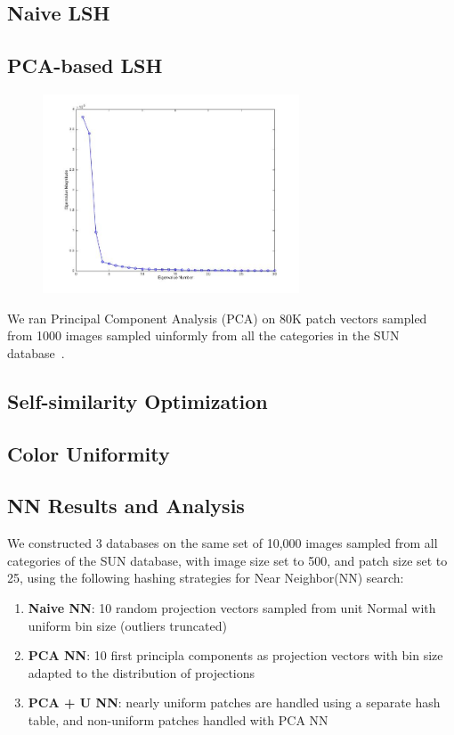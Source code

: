 \subsection{Naive LSH}

\subsection{PCA-based LSH}


\begin{figure}[ht!]
\centering
\includegraphics[width=3in]{fig_NN/lambdas.jpg}
\label{fig:lambdas}
\end{figure}

We ran Principal Component Analysis (PCA) on 80K patch vectors
sampled from 1000 images
sampled uinformly from all the categories in the
SUN database~\cite{SUN}.


\subsection{Self-similarity Optimization}

\subsection{Color Uniformity}



\subsection{NN Results and Analysis}

We constructed 3 databases on the same set of
10,000 images sampled
from all categories of the SUN database, with image size
set to 500, and patch size set to 25, using the following
hashing strategies for Near Neighbor(NN) search:\\
\begin{enumerate}
\item \textbf{Naive NN}: 10 random projection vectors sampled from unit Normal with
uniform bin size (outliers truncated)
\item \textbf{PCA NN}: 10 first principla components as projection vectors with
bin size adapted to the distribution of projections
\item \textbf{PCA + U NN}: nearly uniform patches are handled using a separate
hash table, and non-uniform patches handled with PCA NN
\end{enumerate}

